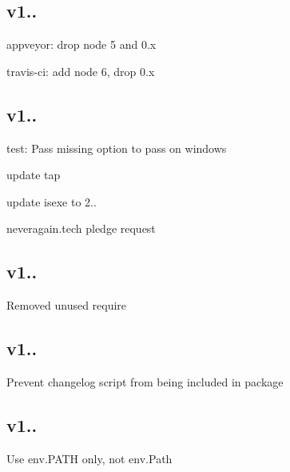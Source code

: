 \subsection*{v1..}


\begin{DoxyItemize}
\item appveyor\+: drop node 5 and 0.\+x
\item travis-\/ci\+: add node 6, drop 0.\+x
\end{DoxyItemize}

\subsection*{v1..}


\begin{DoxyItemize}
\item test\+: Pass missing option to pass on windows
\item update tap
\item update isexe to 2..
\item neveragain.\+tech pledge request
\end{DoxyItemize}

\subsection*{v1..}


\begin{DoxyItemize}
\item Removed unused require
\end{DoxyItemize}

\subsection*{v1..}


\begin{DoxyItemize}
\item Prevent changelog script from being included in package
\end{DoxyItemize}

\subsection*{v1..}


\begin{DoxyItemize}
\item Use env.\+P\+A\+TH only, not env.\+Path
\end{DoxyItemize}

